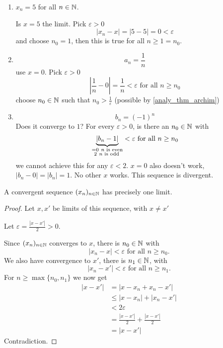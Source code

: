 \documentclass[10pt, a4paper]{article}
\newcommand{\seq}[1][x]{(#1_n)_{n \in \N}}
\begin{document}
\begin{example}
    \begin{enumerate}[label = (\alph*)]
    \item
    $x_n = 5$ for all $n \in \mathbb{N}$.

    Is $x = 5$ the limit.
    Pick $\varepsilon > 0$
    \[
    |x_n - x| = |5 - 5| = 0 < \varepsilon
    \]
    and choose $n_0 = 1$,
    then this is true for all $n \geq 1 = n_0$.
    \item 
    \[
    a_n = \frac{1}{n}
    \]
    use $x = 0$.
    Pick $\varepsilon > 0$
    \[
    \left|\frac{1}{n} - 0\right| = \frac{1}{n} < \varepsilon\text{ for all } n \geq n_0
    \]
    choose $n_0 \in \mathbb{N}$ such that $n_0 > \frac{1}{\varepsilon}$ (possible by \autoref{analy_thm_archim})
    \item
    \[
    b_n = (-1) ^ n
    \]
    Does it converge to $1$?
    For every $\varepsilon > 0$,
    is there an $n_0 \in \mathbb{N}$ with
    \[
    \underbrace{|b_n - 1|}_{\begin{subarray}
        \phantom{}= 0\ n \text{ is even} \\
        \ 2\ n \text{ is odd}
    \end{subarray}} < \varepsilon\text{ for all } n \geq n_0
    \]
    we cannot achieve this for any $\varepsilon < 2$.
    $x = 0$ also doesn't work,
    $|b_n - 0| = |b_n| = 1$.
    No other $x$ works.
    This sequence is divergent.
    \end{enumerate}
\end{example}

\begin{theorem}
    A convergent sequence $\seq$ has precisely one limit.
    \begin{proof}
        Let $x, x'$ be limits of this sequence,
        with $x \neq x'$

        Let $\varepsilon = \frac{|x - x'|}{2} > 0$.

        Since $\seq$ converges to $x$,
        there is $n_0 \in \mathbb{N}$ with
        \[
        |x_n - x| < \varepsilon\text{ for all } n \geq n_0.
        \]
        We also have convergence to $x'$,
        there is $n_1 \in \mathbb{N}$, with
        \[
        |x_n - x'| < \varepsilon\text{ for all } n \geq n_1.
        \]
        For $n \geq \max\{n_0, n_1\}$ we now get
        \begin{align*}
            |x - x'| &= |x - x_n + x_n - x'| \\
            &\leq |x - x_n| + |x_n - x'| \\
            &< 2\varepsilon \\
            &= \frac{|x - x'|}{2} + \frac{|x - x'|}{2} \\
            &= |x - x'|
        \end{align*}
        Contradiction.
    \end{proof}
\end{theorem}
\end{document}
